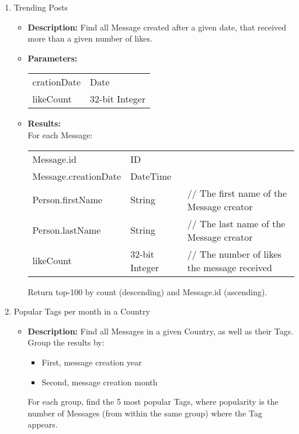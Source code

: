 {\begin{enumerate}
                  \item Trending Posts 
                    \begin{itemize}
                      \item \textbf{Description:}
                        Find all Message created after a given date, that received more than a given number of likes.
                      \item \textbf{Parameters:} \\
                        \begin{tabular}{ll}
                          crationDate & Date \\
                          likeCount & 32-bit Integer \\
                        \end{tabular}
                      \item \textbf{Results:} \\
                        For each Message:
                        \begin{tabular}{lll}
                          Message.id & ID & \\
                          Message.creationDate & DateTime & \\
                          Person.firstName & String & \parbox[t]{20cm}{ // The first name of the Message creator \strut} \\
                          Person.lastName & String & \parbox[t]{20cm}{ // The last name of the Message creator \strut} \\
                          likeCount & 32-bit Integer & \parbox[t]{20cm}{ // The number of likes the message received \strut}\\
                        \end{tabular}
                        Return top-100 by count (descending) and Message.id (ascending). 
                    \end{itemize}

                  \item Popular Tags per month in a Country 
                    \begin{itemize}
                      \item \textbf{Description:}
                        Find all Messages in a given Country, as well as their Tags.
                        Group the results by:
                        \begin{itemize}
                          \item First, message creation year
                          \item Second, message creation month
                        \end{itemize}
                        For each group, find the 5 most popular Tags, where popularity is the number of Messages
                        (from within the same group) where the Tag appears.


\end{itemize}
\end{enumerate}}
